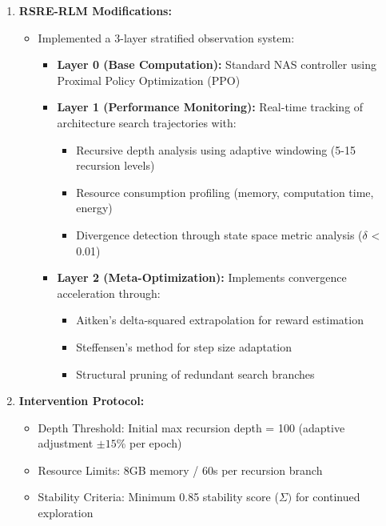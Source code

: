 \documentclass[
]{article}
\providecommand{\tightlist}{%
  \setlength{\itemsep}{0pt}\setlength{\parskip}{0pt}}
\begin{document}
\begin{enumerate}
\def\labelenumi{\arabic{enumi}.}
\setcounter{enumi}{1}
\tightlist
\item
  \textbf{RSRE-RLM Modifications:}

  \begin{itemize}
  \tightlist
  \item
    Implemented a 3-layer stratified observation system:

    \begin{itemize}
    \tightlist
    \item
      \textbf{Layer 0 (Base Computation):} Standard NAS controller using
      Proximal Policy Optimization (PPO)
    \item
      \textbf{Layer 1 (Performance Monitoring):} Real-time tracking of
      architecture search trajectories with:

      \begin{itemize}
      \tightlist
      \item
        Recursive depth analysis using adaptive windowing (5-15
        recursion levels)
      \item
        Resource consumption profiling (memory, computation time,
        energy)
      \item
        Divergence detection through state space metric analysis
        (\(\delta \) \textless{} 0.01)
      \end{itemize}
    \item
      \textbf{Layer 2 (Meta-Optimization):} Implements convergence
      acceleration through:

      \begin{itemize}
      \tightlist
      \item
        Aitken's delta-squared extrapolation for reward estimation
      \item
        Steffensen's method for step size adaptation
      \item
        Structural pruning of redundant search branches
      \end{itemize}
    \end{itemize}
  \end{itemize}
\item
  \textbf{Intervention Protocol:}

  \begin{itemize}
  \tightlist
  \item
    Depth Threshold: Initial max recursion depth = 100 (adaptive
    adjustment \(\pm 15\)\% per epoch)
  \item
    Resource Limits: 8GB memory / 60s per recursion branch
  \item
    Stability Criteria: Minimum 0.85 stability score (\(\Sigma )\) for
    continued exploration
  \end{itemize}
\end{enumerate}
\end{document}
